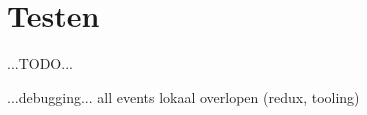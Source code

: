 
\section{Testen}
\label{sec:testen}

...TODO...

...debugging... all events lokaal overlopen (redux, tooling)